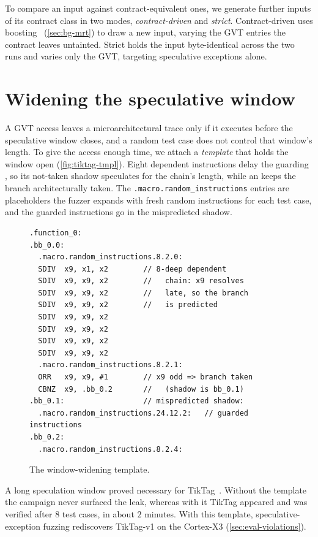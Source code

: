 To compare an input against contract-equivalent ones, we generate further inputs of its contract
class in two modes, \emph{contract-driven} and \emph{strict}. Contract-driven uses
boosting~\cite{hide_seek} (\autoref{sec:bg-mrt}) to draw a new input, varying the GVT entries the
contract leaves untainted. Strict holds the input byte-identical across the two runs and varies
only the GVT, targeting speculative exceptions alone.

\section{Widening the speculative window}
\label{sec:precond-window}

A GVT access leaves a microarchitectural trace only if it executes before the speculative window
closes, and a random test case does not control that window's length. To give the access enough
time, we attach a \emph{template} that holds the window open (\autoref{fig:tiktag-tmpl}). Eight
dependent  instructions delay the guarding , so its not-taken shadow speculates
for the chain's length, while an  keeps the branch architecturally taken. The
\texttt{.macro.random\_instructions} entries are placeholders the fuzzer expands with fresh random
instructions for each test case, and the guarded instructions go in the mispredicted shadow.

\begin{figure}[t]
\centering
\begin{minipage}{0.80\linewidth}
\footnotesize
\begin{verbatim}
.function_0:
.bb_0.0:
  .macro.random_instructions.8.2.0:
  SDIV  x9, x1, x2        // 8-deep dependent
  SDIV  x9, x9, x2        //   chain: x9 resolves
  SDIV  x9, x9, x2        //   late, so the branch
  SDIV  x9, x9, x2        //   is predicted
  SDIV  x9, x9, x2
  SDIV  x9, x9, x2
  SDIV  x9, x9, x2
  SDIV  x9, x9, x2
  .macro.random_instructions.8.2.1:
  ORR   x9, x9, #1        // x9 odd => branch taken
  CBNZ  x9, .bb_0.2       //   (shadow is bb_0.1)
.bb_0.1:                  // mispredicted shadow:
  .macro.random_instructions.24.12.2:   // guarded instructions
.bb_0.2:
  .macro.random_instructions.8.2.4:
\end{verbatim}
\end{minipage}
\caption{The window-widening template.}
\label{fig:tiktag-tmpl}
\end{figure}

A long speculation window proved necessary for TikTag~\cite{tiktag}. Without the template the
campaign never surfaced the leak, whereas with it TikTag appeared and was verified after $8$ test
cases, in about $2$ minutes. With this template, speculative-exception fuzzing rediscovers
TikTag-v1 on the Cortex-X3 (\autoref{sec:eval-violations}).
